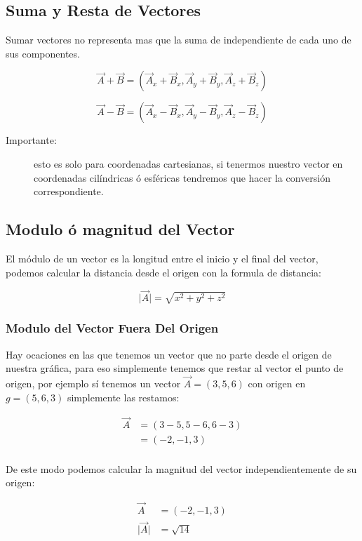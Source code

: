 \documentclass{article}
\begin{document}
\subsection{Suma y Resta de Vectores}
\label{sec:org10884ec}
Sumar vectores no representa mas que la suma de independiente de cada uno de sus componentes.

\[
\vec{A} + \vec{B} = (\vec{A}_x + \vec{B}_x,\vec{A}_y + \vec{B}_y,\vec{A}_z + \vec{B}_z)
\]

\[
\vec{A} - \vec{B} = (\vec{A}_x - \vec{B}_x,\vec{A}_y - \vec{B}_y,\vec{A}_z - \vec{B}_z)
\]

\begin{description}
\item[{Importante:}] esto es solo para coordenadas cartesianas, si tenermos nuestro vector en coordenadas cilíndricas ó esféricas tendremos que hacer la conversión correspondiente.
\end{description}

\subsection{Modulo ó magnitud del Vector}
\label{sec:org31c02e1}
El módulo de un vector es la longitud entre el inicio y el final del vector, podemos calcular la distancia desde el origen con la formula de distancia:

\[
\vert\vec{A}\vert = \sqrt{ x^2 + y^2 + z^2 }
\]

\subsubsection*{Modulo del Vector Fuera Del Origen}
\label{sec:orgc8f326a}
Hay ocaciones en las que tenemos un vector que no parte desde el origen de nuestra gráfica, para eso simplemente tenemos que restar al vector el punto de origen, por ejemplo sí tenemos un vector \(\vec{A} = (3,5,6)\) con origen en \(g = (5,6,3)\) simplemente las restamos:

\[ \begin{aligned}
\vec{A} &= (3-5,5-6,6-3) \\
~ &= (-2,-1,3) \\
\end{aligned} \]

De este modo podemos calcular la magnitud del vector independientemente de su origen:

\[ \begin{aligned}
\vec{A} &= (-2,-1,3) \\
\vert\vec{A}\vert &= \sqrt{14} \\
\end{aligned} \]
\end{document}

